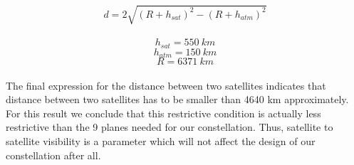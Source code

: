 \documentclass{article}
\begin{document}
\[ d = 2 \sqrt{(R+h_{sat})^2 - (R+h_{atm})^2} \]\\

\[ h_{sat} = 550\ km\] 
\[ h_{atm} = 150\ km\]
\[R = 6371\ km\] \\

The final expression for the distance between two satellites indicates that distance between two satellites has to be smaller than 4640 km approximately. For this result we conclude that this restrictive condition is actually less restrictive than the 9 planes needed for our constellation. Thus, satellite to satellite visibility is a parameter which will not affect the design of our constellation after all. 
\end{document}
